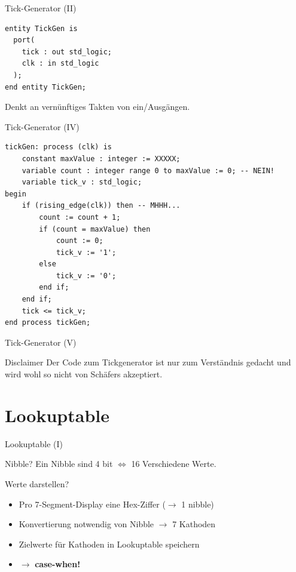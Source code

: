 \documentclass[aspectratio=169,presentation]{beamer}
\begin{document}
\begin{frame} [fragile] {Tick-Generator (II)}
	\begin{lstlisting}
entity TickGen is
  port(
    tick : out std_logic;
    clk : in std_logic
  );
end entity TickGen;
  \end{lstlisting}
  \begin{alertblock} {}
    Denkt an vernünftiges Takten von ein/Ausgängen.
  \end{alertblock}
\end{frame}

\begin{frame} [fragile] {Tick-Generator (IV)}
	\begin{lstlisting}
tickGen: process (clk) is
	constant maxValue : integer := XXXXX;
	variable count : integer range 0 to maxValue := 0; -- NEIN!
	variable tick_v : std_logic;
begin
	if (rising_edge(clk)) then -- MHHH...
		count := count + 1;
		if (count = maxValue) then
			count := 0;
			tick_v := '1';
		else
			tick_v := '0';
		end if;
	end if;
	tick <= tick_v;
end process tickGen;
	\end{lstlisting}
\end{frame}

\begin{frame} {Tick-Generator (V)}
  \begin{alertblock} {Disclaimer}
    Der Code zum Tickgenerator ist nur zum Verständnis gedacht und wird wohl so 
    nicht von Schäfers akzeptiert.
  \end{alertblock}
\end{frame}


\section{Lookuptable}
\begin{frame} {Lookuptable (I)}
  \begin{exampleblock} {Nibble?}
    Ein Nibble sind 4 bit $\Leftrightarrow$ 16 Verschiedene Werte.
  \end{exampleblock}

  \begin{block} {Werte darstellen?}
    \begin{itemize}
      \item Pro 7-Segment-Display eine Hex-Ziffer ($\rightarrow$ 1 nibble)
      \item Konvertierung notwendig von Nibble $\rightarrow$ 7 Kathoden
      \item Zielwerte für Kathoden in Lookuptable speichern
      \item $\rightarrow$ \textbf{case-when!}
    \end{itemize}
  \end{block}
\end{frame}
\end{document}
